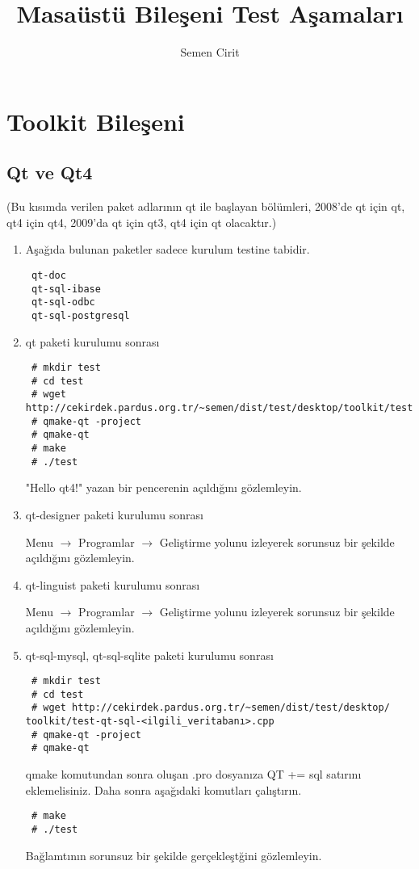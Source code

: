 \documentclass[a4paper,10pt]{article}
\title{Masaüstü Bileşeni Test Aşamaları}
\author{Semen Cirit}
\begin{document}
\maketitle

\section{Toolkit Bileşeni}
\subsection*{Qt ve Qt4}

(Bu kısımda verilen paket adlarının qt ile başlayan bölümleri, 2008'de qt için qt, qt4 için qt4, 2009'da qt için qt3, qt4 için qt olacaktır.)
\begin{enumerate}
 \item Aşağıda bulunan paketler sadece kurulum testine tabidir.
\begin{verbatim}
 qt-doc
 qt-sql-ibase
 qt-sql-odbc
 qt-sql-postgresql
\end{verbatim}
 \item qt paketi kurulumu sonrası
\begin{verbatim}
 # mkdir test
 # cd test
 # wget http://cekirdek.pardus.org.tr/~semen/dist/test/desktop/toolkit/test.cpp
 # qmake-qt -project
 # qmake-qt
 # make
 # ./test
\end{verbatim}

"Hello qt4!" yazan bir pencerenin açıldığını gözlemleyin.
\item qt-designer paketi kurulumu sonrası

Menu $\rightarrow$ Programlar $\rightarrow$ Geliştirme yolunu izleyerek sorunsuz bir şekilde açıldığını gözlemleyin.

\item qt-linguist paketi kurulumu sonrası

Menu $\rightarrow$ Programlar $\rightarrow$ Geliştirme yolunu izleyerek sorunsuz bir şekilde açıldığını gözlemleyin.

\item qt-sql-mysql, qt-sql-sqlite paketi kurulumu sonrası
\begin{verbatim}
 # mkdir test
 # cd test
 # wget http://cekirdek.pardus.org.tr/~semen/dist/test/desktop/ 
toolkit/test-qt-sql-<ilgili_veritabanı>.cpp
 # qmake-qt -project
 # qmake-qt
\end{verbatim}
qmake komutundan sonra oluşan .pro dosyanıza QT += sql satırını eklemelisiniz. Daha sonra aşağıdaki komutları çalıştırın.
\begin{verbatim}
 # make
 # ./test
\end{verbatim}

Bağlamtının sorunsuz bir şekilde gerçekleştğini gözlemleyin.

\end{enumerate}
\end{document}
